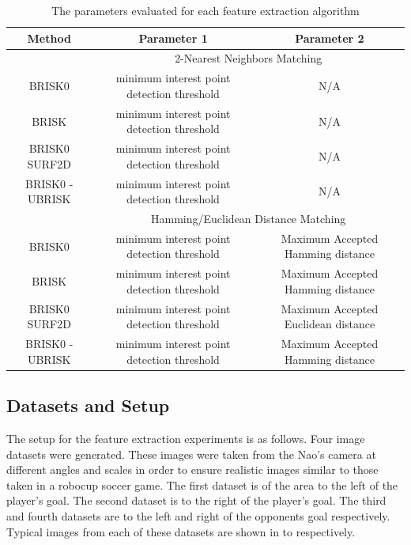 \documentclass{article}
\begin{document}
\begin{table}
\caption{The parameters evaluated for each feature extraction algorithm}
\begin{tabular}{|c|c|c|}
\hline 
Method & Parameter 1 & Parameter 2\tabularnewline
\hline 
 & \multicolumn{2}{c}{2-Nearest Neighbors Matching}\tabularnewline
\hline 
BRISK0 & minimum interest point detection threshold & N/A\tabularnewline
\hline 
BRISK & minimum interest point detection threshold & N/A\tabularnewline
\hline 
BRISK0 SURF2D & minimum interest point detection threshold & N/A\tabularnewline
\hline 
BRISK0 - UBRISK & minimum interest point detection threshold & N/A\tabularnewline
\hline 
 & \multicolumn{2}{c}{Hamming/Euclidean Distance Matching}\tabularnewline
\hline 
BRISK0 & minimum interest point detection threshold & Maximum Accepted Hamming distance\tabularnewline
\hline 
BRISK & minimum interest point detection threshold & Maximum Accepted Hamming distance\tabularnewline
\hline 
BRISK0 SURF2D & minimum interest point detection threshold & Maximum Accepted Euclidean distance\tabularnewline
\hline 
BRISK0 - UBRISK & minimum interest point detection threshold & Maximum Accepted Hamming distance\tabularnewline
\hline 
\end{tabular}
\label{tab:parameters}
\end{table}

\subsection{Datasets and Setup}
\label{sec:datasets}
The setup for the feature extraction experiments is as follows. Four image datasets were generated. These images were taken from the Nao's camera at different angles and scales in order to ensure realistic images similar to those taken in a robocup soccer game. The first dataset is of the area to the left of the player's goal. The second dataset is to the right of the player's goal. The third and fourth datasets are to the left and right of the opponents goal respectively. Typical images from each of these datasets are shown in  to  respectively.\\
\end{document}
